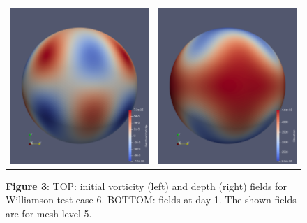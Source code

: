 \documentclass[a4paper,10pt]{article}
\begin{document}
\begin{figure}[t]
\begin{tabular}{cc}
 \hspace{-0em}\includegraphics[scale=0.125]{Images/vorticity_24.png} &
 \hspace{-0em}\includegraphics[scale=0.125]{Images/elevation_24.png} \\
 \end{tabular}\vspace{-10pt}
  \caption*{{\bfseries Figure 3}: TOP: initial vorticity (left) and depth (right) fields
  for Williamson test case 6. BOTTOM: fields at day 1. The shown fields are for mesh level 5.
  }
  \end{figure}
\end{document}
